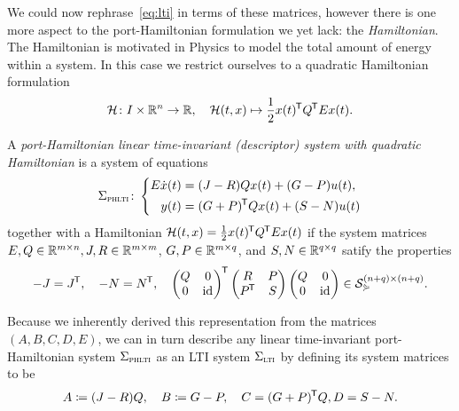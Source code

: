 We could now rephrase~\eqref{eq:lti} in terms of these matrices, however there is one more aspect to the port-Hamiltonian formulation we yet lack: the \emph{Hamiltonian}.
The Hamiltonian is motivated in Physics to model the total amount of energy within a system.
In this case we restrict ourselves to a quadratic Hamiltonian formulation
\begin{equation}\label{eq:quadratic-hamiltonian}
    \mathcal{H} \colon I \times \mathbb{R}^{n} \to \mathbb{R},\quad \mathcal{H}(t, x) \mapsto \frac{1}{2} x(t)^{\mkern-1.5mu \mathsf{T}} Q^{\mkern-1.5mu \mathsf{T}} E x(t).
\end{equation}

\begin{definition}\label{def:phlti}
    A \emph{port-Hamiltonian linear time-invariant (descriptor) system with quadratic Hamiltonian} is a system of equations
    \begin{equation}\label{eq:phlti}
        \Sigma_{\textnormal{\scshape phlti}} \colon \left\lbrace
        \begin{aligned}
            E \dot{x}(t) &= (J - R) Q x(t) + (G - P) u(t), \\
            y(t) &= (G + P)^{\mkern-1.5mu \mathsf{T}} Q x(t) + (S - N) u(t)
        \end{aligned}
        \right.
    \end{equation}
    together with a Hamiltonian $\mathcal{H}(t, x) = \frac{1}{2} x(t)^{\mkern-1.5mu \mathsf{T}} Q^{\mkern-1.5mu \mathsf{T}} E x(t)$ if the system matrices $E, Q \in \mathbb{R}^{m \times n}, J, R \in \mathbb{R}^{m \times m}$, $G, P \in \mathbb{R}^{m \times q}$, and $S, N \in \mathbb{R}^{q \times q}$ satify the properties
    \begin{equation}\label{eq:ph-matrix-structure}
        -J = J^{\mkern-1.5mu \mathsf{T}},\quad -N = N^{\mkern-1.5mu \mathsf{T}},\quad
        \begin{pmatrix}
            Q & 0 \\
            0 & \text{id}_{}
        \end{pmatrix}^{\mkern-1.5mu \mathsf{T}}
        \begin{pmatrix}
            R & P \\
            P^{\mkern-1.5mu \mathsf{T}} & S
        \end{pmatrix}
        \begin{pmatrix}
            Q & 0 \\
            0 & \text{id}_{}
        \end{pmatrix}
        \in \mathcal{S}_{\curlyeqsucc}^{(n + q) \times (n + q)}.
    \end{equation}
\end{definition}

\begin{remark}
    Because we inherently derived this representation from the matrices $(A, B, C, D, E)$, we can in turn describe any linear time-invariant port-Hamiltonian system $\Sigma_{\textnormal{\scshape phlti}}$ as an LTI system $\Sigma_{\textnormal{\scshape lti}}$ by defining its system matrices to be
    \begin{equation*}
        A \coloneqq (J - R) Q,\quad B \coloneqq G - P,\quad C = (G + P)^{\mkern-1.5mu \mathsf{T}} Q, D = S - N.
    \end{equation*}
\end{remark}

